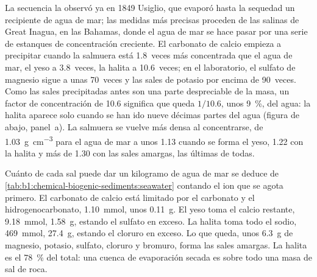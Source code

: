 La secuencia la observó ya en 1849 Usiglio, que evaporó hasta la sequedad un recipiente de agua de mar; las medidas más precisas proceden de las salinas de Great Inagua, en las Bahamas, donde
el agua de mar se hace pasar por una serie de estanques de concentración creciente. El carbonato de calcio empieza a precipitar cuando la salmuera está 1.8~veces más concentrada que el agua de mar,
el yeso a 3.8~veces, la halita a 10.6~veces; en el laboratorio, el sulfato de magnesio sigue a unas 70~veces y las sales de potasio por encima de 90~veces. Como las sales precipitadas antes son una parte
despreciable de la masa, un factor de concentración de 10.6 significa que queda $1/10.6$, unos \qty{9}{\%}, del agua: la halita aparece solo cuando se han ido nueve décimas partes del agua (figura de abajo, panel~a).
La salmuera se vuelve más densa al concentrarse, de \qty{1.03}{g.cm^{-3}} para el agua de mar a unos \num{1.13} cuando se forma el yeso, \num{1.22} con la halita y más de \num{1.30} con las sales amargas, las últimas de todas.

Cuánto de cada sal puede dar un kilogramo de agua de mar se deduce de \cref{tab:b1:chemical-biogenic-sediments:seawater} contando el ion que se agota primero. El carbonato de calcio está limitado por el
carbonato y el hidrogenocarbonato, \qty{1.10}{mmol}, unos \qty{0.11}{g}. El yeso toma el calcio restante, \qty{9.18}{mmol}, \qty{1.58}{g}, estando el sulfato en exceso. La halita toma todo el sodio,
\qty{469}{mmol}, \qty{27.4}{g}, estando el cloruro en exceso. Lo que queda, unos \qty{6.3}{g} de magnesio, potasio, sulfato, cloruro y bromuro, forma las sales amargas. La halita es el \qty{78}{\%} del total:
una cuenca de evaporación secada es sobre todo una masa de sal de roca.

